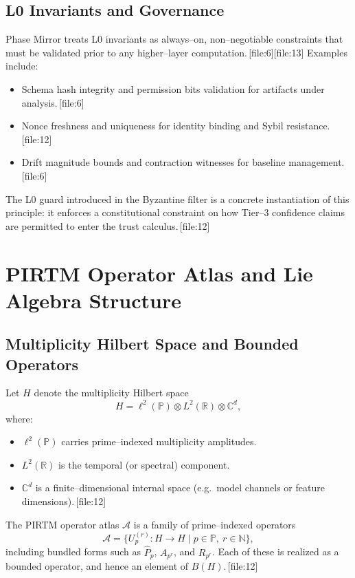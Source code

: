 \documentclass[11pt]{article}
\begin{document}
\subsection{L0 Invariants and Governance}

Phase Mirror treats L0 invariants as always--on, non--negotiable constraints
that must be validated prior to any higher--layer computation.\,[file:6][file:13]
Examples include:

\begin{itemize}[leftmargin=*]
  \item Schema hash integrity and permission bits validation for artifacts
  under analysis.\,[file:6]
  \item Nonce freshness and uniqueness for identity binding and Sybil
  resistance.\,[file:12]
  \item Drift magnitude bounds and contraction witnesses for baseline
  management.\,[file:6]
\end{itemize}

The L0 guard introduced in the Byzantine filter is a concrete instantiation of
this principle: it enforces a constitutional constraint on how Tier--3
confidence claims are permitted to enter the trust calculus.\,[file:12]

\section{PIRTM Operator Atlas and Lie Algebra Structure}

\subsection{Multiplicity Hilbert Space and Bounded Operators}

Let \(H\) denote the multiplicity Hilbert space
\[
  H = \ell^2(\mathbb{P}) \otimes L^2(\mathbb{R}) \otimes \mathbb{C}^d,
\]
where:
\begin{itemize}[leftmargin=*]
  \item \(\ell^2(\mathbb{P})\) carries prime--indexed multiplicity amplitudes.
  \item \(L^2(\mathbb{R})\) is the temporal (or spectral) component.
  \item \(\mathbb{C}^d\) is a finite--dimensional internal space (e.g.\ model
  channels or feature dimensions).\,[file:12]
\end{itemize}

The PIRTM operator atlas \(\mathcal{A}\) is a family of prime--indexed
operators
\[
  \mathcal{A} = \{ U_p^{(r)} : H \to H \mid p \in \mathbb{P},\ r \in \mathbb{N} \},
\]
including bundled forms such as \(\hat{P}_p\), \(A_{p^r}\), and \(R_{p^r}\).
Each of these is realized as a bounded operator, and hence an element of
\(B(H)\).\,[file:12]
\end{document}
